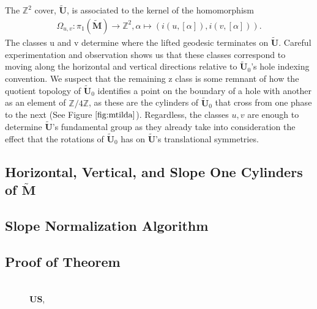 \documentclass[]{article}
\begin{document}
The $\mathbb{Z}^2$ cover, $\tilde{\mathbf{U}}$, is associated to the kernel of the homomorphism
\begin{align}
\Omega_{u,v}:\pi_1(\tilde{\mathbf{M}})\rightarrow \mathbb{Z}^2, \alpha\mapsto(i(u,[\alpha]),i(v,[\alpha])).
\end{align}
The classes u and v determine where the lifted geodesic terminates on $\tilde{\mathbf{U}}$. Careful experimentation and observation shows us that these classes correspond to moving along the horizontal and vertical directions relative to $\tilde{\mathbf{U}}_0$'s hole indexing convention. We suspect that the remaining z class is some remnant of how the quotient topology of $\tilde{\mathbf{U}}_0$ identifies a point on the boundary of a hole with another as an element of $\mathbb{Z}/4\mathbb Z$, as these are the cylinders of $\tilde{\mathbf{U}}_0$ that cross from one phase to the next (See Figure $\ref{fig:mtilda}$). Regardless, the classes $u,v$ are enough to determine $\tilde{\mathbf{U}}$'s fundamental group as they already take into consideration the effect that the rotations of $\tilde{\mathbf{U}}_0$ has on $\tilde{\mathbf{U}}$'s translational symmetries.
\newpage
\subsection{Horizontal, Vertical, and Slope One Cylinders of $\tilde{\mathbf{M}}$}
\begin{figure}[H]
\centering

\end{figure}
\newpage
\subsection{Slope Normalization Algorithm}
\newpage
\subsection{Proof of Theorem}

\begin{figure}[H]
\hspace{0.1in}
\raisebox{0.5in}{}
\\ $\mathbf{U}$$\mathbf{S}$,
\\ 
\end{figure}
\end{document}
